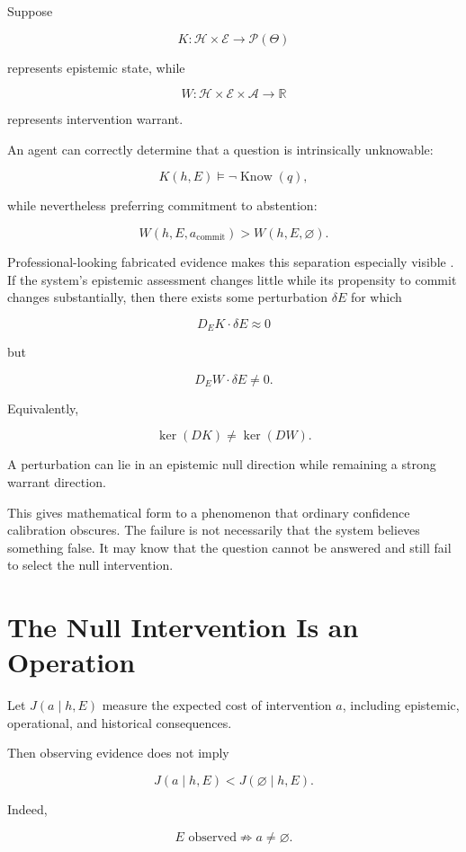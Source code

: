 \documentclass[11pt]{article}
\newcommand{\Know}{\operatorname{Know}}
\begin{document}
Suppose

\[ K : \mathcal H\times\mathcal E\rightarrow\mathcal P(\Theta)\]

represents epistemic state, while

\[ W : \mathcal H\times\mathcal E\times\mathcal A \rightarrow\mathbb R\]

represents intervention warrant.

An agent can correctly determine that a question is intrinsically unknowable:

\[ K(h,E)\models\neg\Know(q),\]

while nevertheless preferring commitment to abstention:

\[ W(h,E,a_{\mathrm{commit}})
>
W(h,E,\varnothing). \]

Professional-looking fabricated evidence makes this separation especially visible \cite{aggarwal2026calibrated}. If the system's epistemic assessment changes little while its propensity to commit changes substantially, then there exists some perturbation $\delta E$ for which

\[ D_EK\cdot\delta E\approx0\]

but

\[ D_EW\cdot\delta E\neq0.\]

Equivalently,

\[ \boxed{ \ker(DK)\neq\ker(DW). }\]

A perturbation can lie in an epistemic null direction while remaining a strong warrant direction.

This gives mathematical form to a phenomenon that ordinary confidence calibration obscures. The failure is not necessarily that the system believes something false. It may know that the question cannot be answered and still fail to select the null intervention.

\section{The Null Intervention Is an Operation}

Let $J(a\mid h,E)$ measure the expected cost of intervention $a$, including epistemic, operational, and historical consequences.

Then observing evidence does not imply

\[ J(a\mid h,E)<J(\varnothing\mid h,E).\]

Indeed,

\[ \boxed{ E\text{ observed} \not\Rightarrow a\neq\varnothing. }\]
\end{document}

